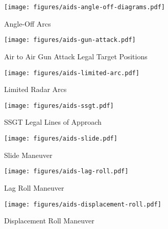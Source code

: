 \documentclass[10pt]{article}
\begin{document}


\twocolumn














\clearpage

\begin{figure*}
\centering
\caption{Angle-Off Arcs}
\medskip
\texttt{[image: figures/aids-angle-off-diagrams.pdf]}
\end{figure*}



\begin{figure*}
\centering
\caption{Air to Air Gun Attack Legal Target Positions}
\medskip
\texttt{[image: figures/aids-gun-attack.pdf]}
\end{figure*}

\begin{figure*}
\centering
\caption{Limited Radar Arcs}
\medskip
\texttt{[image: figures/aids-limited-arc.pdf]}
\end{figure*}

\begin{figure*}
\centering
\caption{SSGT Legal Lines of Approach}
\medskip
\texttt{[image: figures/aids-ssgt.pdf]}
\end{figure*}

\begin{figure}
\centering
\caption{Slide Maneuver}
\medskip
\texttt{[image: figures/aids-slide.pdf]}
\end{figure}

\begin{figure}
\centering
\caption{Lag Roll Maneuver}
\medskip
\texttt{[image: figures/aids-lag-roll.pdf]}
\end{figure}

\begin{figure}
\centering
\caption{Displacement Roll Maneuver}
\medskip
\texttt{[image: figures/aids-displacement-roll.pdf]}
\end{figure}
\end{document}
